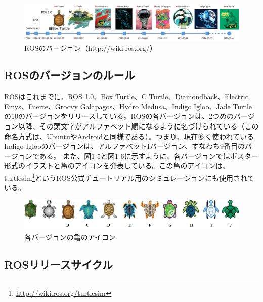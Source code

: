 \begin{figure}[h]
  \centering
  \includegraphics[width=\columnwidth]{pictures/chapter1/pic_01_05.png}
  \caption{ROSのバージョン（http://wiki.ros.org/）}
\end{figure}

\subsection{ROSのバージョンのルール}

ROSはこれまでに、ROS 1.0、Box Turtle、C Turtle、Diamondback、Electric Emys、Fuerte、Groovy Galapagos、Hydro Medusa、Indigo Igloo、Jade Turtleの10のバージョンをリリースしている。ROSの各バージョンは、2つめのバージョン以降、その頭文字がアルファベット順になるように名づけられている（この命名方式は、UbuntuやAndroidと同様である）。つまり、現在多く使われているIndigo Iglooのバージョンは、アルファベットIバージョン、すなわち9番目のバージョンである。
また、図1-5と図1-6に示すように、各バージョンではポスター形式のイラストと亀のアイコンを発表している。この亀のアイコンは、turtlesim\footnote{\url{http://wiki.ros.org/turtlesim}}というROS公式チュートリアル用のシミュレーションにも使用されている。

\begin{figure}[h]
  \centering
  \includegraphics[width=\columnwidth]{pictures/chapter1/pic_01_06.png}
  \caption{各バージョンの亀のアイコン}
\end{figure}

\subsection{ROSリリースサイクル}

